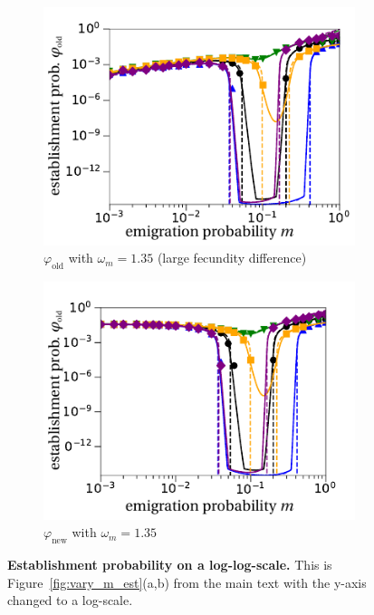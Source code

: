 \documentclass[11pt]{article}
\begin{document}
\begin{figure}[h!]
    \centering
	\begin{subfigure}{.5\textwidth}
  		\centering
  		\includegraphics[width=\linewidth]{loglog_a.pdf}
  		\caption{$\varphi_{\text{old}}$ with $\omega_m = 1.35$ (large fecundity difference)}
	\end{subfigure}%
	\begin{subfigure}{.5\textwidth}
 		 \centering
 		 \includegraphics[width=\linewidth]{loglog_b.pdf}
  		\caption{$\varphi_{\text{new}}$ with $\omega_m = 1.35$}
	\end{subfigure}
    \caption{\textbf{Establishment probability on a log-log-scale.} This is Figure~\ref{fig:vary_m_est}(a,b) from the main text with the y-axis changed to a log-scale.}
    \label{fig:loglog}
\end{figure}
\end{document}
